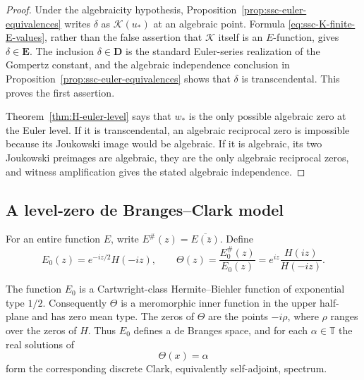 \begin{proof}
Under the algebraicity hypothesis,
Proposition~\ref{prop:ssc-euler-equivalences} writes \(\delta\) as
\(\mathcal K(u_*)\) at an algebraic point.  Formula
\eqref{eq:ssc-K-finite-E-values}, rather than the false assertion that
\(\mathcal K\) itself is an \(E\)-function, gives
\(\delta\in\mathbf E\).  The inclusion
\(\delta\in\mathbf D\) is the standard Euler-series realization of the
Gompertz constant, and the algebraic independence conclusion in
Proposition~\ref{prop:ssc-euler-equivalences} shows that \(\delta\) is
transcendental.  This proves the first assertion.

Theorem~\ref{thm:H-euler-level} says that \(w_*\) is the only possible
algebraic zero at the Euler level.  If it is transcendental, an algebraic
reciprocal zero is impossible because its Joukowski image would be
algebraic.  If it is algebraic, its two Joukowski preimages are algebraic,
they are the only algebraic reciprocal zeros, and witness amplification
gives the stated algebraic independence.
\end{proof}

\subsection{A level-zero de Branges--Clark model}

For an entire function \(E\), write
\(E^\#(z)=\overline{E(\bar z)}\).  Define
\begin{equation}\label{eq:ssc-E0-Theta}
 E_0(z)=e^{-iz/2}H(-iz),\qquad
 \Theta(z)=\frac{E_0^\#(z)}{E_0(z)}
          =e^{iz}\frac{H(iz)}{H(-iz)}.
\end{equation}

\begin{theorem}
\label{thm:ssc-HB-Clark}
The function \(E_0\) is a Cartwright-class Hermite--Biehler function of
exponential type \(1/2\).  Consequently \(\Theta\) is a meromorphic inner
function in the upper half-plane and has zero mean type.  The zeros of
\(\Theta\) are the points \(-i\rho\), where \(\rho\) ranges over the zeros
of \(H\).
Thus \(E_0\) defines a de Branges space, and for each
\(\alpha\in\mathbb T\) the real solutions of
\begin{equation}\label{eq:ssc-Clark-level}
 \Theta(x)=\alpha
\end{equation}
form the corresponding discrete Clark, equivalently self-adjoint, spectrum.
\end{theorem}


